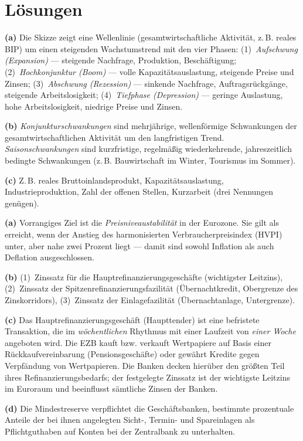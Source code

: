 \documentclass[11pt, a4paper]{article}
\begin{document}
\newpage
\section{Lösungen}\label{loesungen}

\begin{loesung}[title={Lösung Aufgabe~1 --- Konjunkturzyklus und Indikatoren}]
\textbf{(a)} Die Skizze zeigt eine Wellenlinie (gesamtwirtschaftliche Aktivität, z.\,B.
reales BIP) um einen steigenden Wachstumstrend mit den vier Phasen:
(1)~\emph{Aufschwung (Expansion)} --- steigende Nachfrage, Produktion, Beschäftigung;
(2)~\emph{Hochkonjunktur (Boom)} --- volle Kapazitätsauslastung, steigende Preise und
Zinsen; (3)~\emph{Abschwung (Rezession)} --- sinkende Nachfrage, Auftragsrückgänge,
steigende Arbeitslosigkeit; (4)~\emph{Tiefphase (Depression)} --- geringe Auslastung,
hohe Arbeitslosigkeit, niedrige Preise und Zinsen.

\textbf{(b)} \emph{Konjunkturschwankungen} sind mehrjährige, wellenförmige Schwankungen
der gesamtwirtschaftlichen Aktivität um den langfristigen Trend.
\emph{Saisonschwankungen} sind kurzfristige, regelmäßig wiederkehrende, jahreszeitlich
bedingte Schwankungen (z.\,B. Bauwirtschaft im Winter, Tourismus im Sommer).

\textbf{(c)} Z.\,B. reales Bruttoinlandsprodukt, Kapazitätsauslastung,
Industrieproduktion, Zahl der offenen Stellen, Kurzarbeit (drei Nennungen genügen).
\end{loesung}

\begin{loesung}[title={Lösung Aufgabe~2 --- Ziele und Instrumente der EZB}]
\textbf{(a)} Vorrangiges Ziel ist die \emph{Preisniveaustabilität} in der Eurozone. Sie
gilt als erreicht, wenn der Anstieg des harmonisierten Verbraucherpreisindex (HVPI) unter,
aber nahe zwei Prozent liegt --- damit sind sowohl Inflation als auch Deflation
ausgeschlossen.

\textbf{(b)} (1)~Zinssatz für die Hauptrefinanzierungsgeschäfte (wichtigster Leitzins),
(2)~Zinssatz der Spitzenrefinanzierungsfazilität (Übernachtkredit, Obergrenze des
Zinskorridors), (3)~Zinssatz der Einlagefazilität (Übernachtanlage, Untergrenze).

\textbf{(c)} Das Hauptrefinanzierungsgeschäft (Haupttender) ist eine befristete
Transaktion, die im \emph{wöchentlichen} Rhythmus mit einer Laufzeit von \emph{einer
Woche} angeboten wird. Die EZB kauft bzw. verkauft Wertpapiere auf Basis einer
Rückkaufvereinbarung (Pensionsgeschäfte) oder gewährt Kredite gegen Verpfändung von
Wertpapieren. Die Banken decken hierüber den größten Teil ihres Refinanzierungsbedarfs;
der festgelegte Zinssatz ist der wichtigste Leitzins im Euroraum und beeinflusst sämtliche
Zinsen der Banken.

\textbf{(d)} Die Mindestreserve verpflichtet die Geschäftsbanken, bestimmte prozentuale
Anteile der bei ihnen angelegten Sicht-, Termin- und Spareinlagen als Pflichtguthaben auf
Konten bei der Zentralbank zu unterhalten.
\end{loesung}
\end{document}
